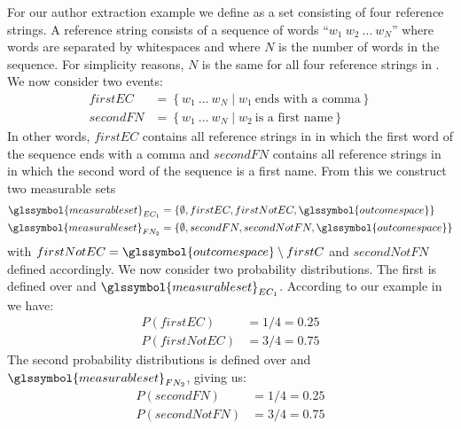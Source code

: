 For our author extraction example we define  as a set consisting of four reference strings.
A reference string consists of a sequence of words ``$w_1\ w_2\ \dots\ w_N$'' where words are separated by whitespaces and where $N$ is the number of words in the sequence.
For simplicity reasons, $N$ is the same for all four reference strings in .
We now consider two events:
\begin{equation*}
  \begin{split}
    firstEC&=\left\{w_1\ \dots\ w_N \mid w_1\ \text{ends with a comma}\right\}\\
    secondFN&=\left\{w_1\ \dots\ w_N \mid w_2\ \text{is a first name}\right\}
  \end{split}
\end{equation*}
In other words, $firstEC$ contains all reference strings in  in which the first word of the sequence ends with a comma and $secondFN$ contains all reference strings in  in which the second word of the sequence is a first name.
From this we construct two \glspl{measurable set}
\begin{equation*}
    \begin{split}
  \glssymbol{measurable set}_{EC_1}&= \left\{\emptyset,firstEC, firstNotEC, \glssymbol{outcome space}\right\}\\
  \glssymbol{measurable set}_{FN_2}&= \left\{\emptyset,secondFN, secondNotFN, \glssymbol{outcome space}\right\}
    \end{split}
\end{equation*}
with $firstNotEC=\glssymbol{outcome space}\setminus firstC$ and $secondNotFN$ defined accordingly.
We now consider two \glspl{probability distribution}.
The first is defined over  and $\glssymbol{measurable set}_{EC_1}$.
According to our example in  we have:
\begin{equation*}
    \begin{split}
      P(firstEC)&=1/4=0.25\\
      P(firstNotEC)&=3/4=0.75
    \end{split}
\end{equation*}
The second \glspl{probability distribution} is defined over  and $\glssymbol{measurable set}_{FN_2}$, giving us:
\begin{equation*}
  \label{equ:eg-measurable-sets}
    \begin{split}
      P(secondFN)&=1/4=0.25\\
      P(secondNotFN)&=3/4=0.75
    \end{split}
\end{equation*}

